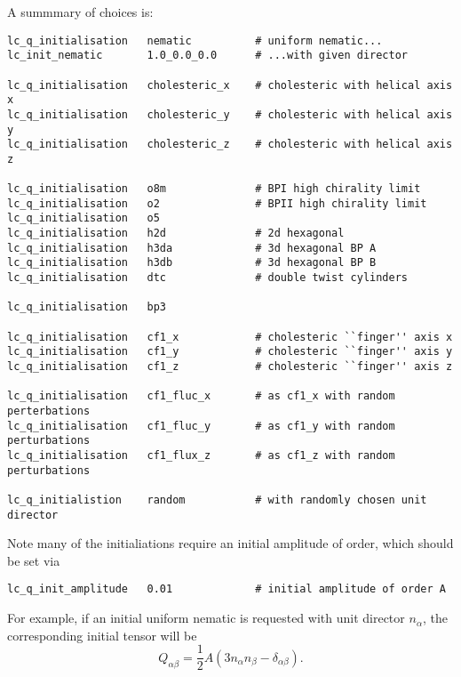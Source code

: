A summmary of choices is:
\begin{lstlisting}
lc_q_initialisation   nematic          # uniform nematic...
lc_init_nematic       1.0_0.0_0.0      # ...with given director

lc_q_initialisation   cholesteric_x    # cholesteric with helical axis x
lc_q_initialisation   cholesteric_y    # cholesteric with helical axis y
lc_q_initialisation   cholesteric_z    # cholesteric with helical axis z

lc_q_initialisation   o8m              # BPI high chirality limit
lc_q_initialisation   o2               # BPII high chirality limit
lc_q_initialisation   o5
lc_q_initialisation   h2d              # 2d hexagonal
lc_q_initialisation   h3da             # 3d hexagonal BP A
lc_q_initialisation   h3db             # 3d hexagonal BP B
lc_q_initialisation   dtc              # double twist cylinders

lc_q_initialisation   bp3

lc_q_initialisation   cf1_x            # cholesteric ``finger'' axis x
lc_q_initialisation   cf1_y            # cholesteric ``finger'' axis y
lc_q_initialisation   cf1_z            # cholesteric ``finger'' axis z

lc_q_initialisation   cf1_fluc_x       # as cf1_x with random perterbations
lc_q_initialisation   cf1_fluc_y       # as cf1_y with random perturbations
lc_q_initialisation   cf1_flux_z       # as cf1_z with random perturbations

lc_q_initialistion    random           # with randomly chosen unit director
\end{lstlisting}
Note many of the initialiations require an initial amplitude of order,
which should be set via
\begin{lstlisting}
lc_q_init_amplitude   0.01             # initial amplitude of order A
\end{lstlisting}
For example, if an initial uniform nematic is requested with
unit director $n_\alpha$, the corresponding initial tensor will be
$$
Q_{\alpha\beta} = 
{\textstyle \frac{1}{2}} A (3 n_\alpha n_\beta - \delta_{\alpha\beta}).
$$

\vfill
\pagebreak
